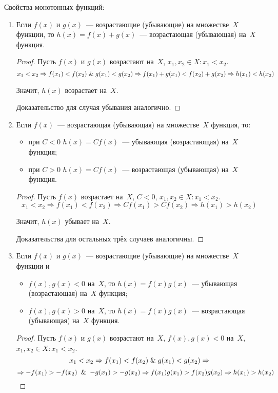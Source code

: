 Свойства монотонных функций:
\begin{enumerate}
	\item Если $f(x)$ и $g(x)$~--- возрастающие (убывающие) на множестве~$X$ функции, то $h(x) = f(x) + g(x)$~--- воз\-ра\-ста\-ющ\-ая (убывающая) на~$X$ функция.
	\begin{proof}
	Пусть $f(x)$ и $g(x)$ возрастают на~$X$, $x_1, x_2 \in X \colon x_1 < x_2$.
	\begin{equation*}
	x_1 < x_2 \Rightarrow
	f(x_1) < f(x_2) \mathrel{\&} g(x_1) < g(x_2) \Rightarrow
	f(x_1) + g(x_1) < f(x_2) + g(x_2) \Rightarrow
	h(x_1) < h(x_2)
	\end{equation*}
	
	Значит, $h(x)$ возрастает на~$X$.
	
	Доказательство для случая убывания аналогично.
	\end{proof}
	
	\item Если $f(x)$~--- возрастающая (убывающая) на множестве~$X$ функция, то:
	\begin{itemize}
		\item при $C < 0$ $h(x) = Cf(x)$~--- убывающая (возрастающая) на~$X$ функция;
		\item при $C > 0$ $h(x) = Cf(x)$~--- возрастающая (убывающая) на~$X$ функция.
	\end{itemize}
	\begin{proof}
	Пусть $f(x)$ возрастает на~$X$, $C < 0$, $x_1, x_2 \in X \colon x_1 < x_2$.
	\begin{equation*}
	x_1 < x_2 \Rightarrow
	f(x_1) < f(x_2) \Rightarrow
	C f(x_1) > C f(x_2) \Rightarrow
	h(x_1) > h(x_2)
	\end{equation*}
	
	Значит, $h(x)$ убывает на~$X$.
	
	Доказательства для остальных трёх случаев аналогичны.
	\end{proof}
	
	\item Если $f(x)$ и $g(x)$~--- возрастающие (убывающие) на множестве~$X$ функции и
	\begin{itemize}
		\item $f(x), g(x) < 0$ на~$X$, то $h(x) = f(x)g(x)$~--- убывающая (возрастающая) на~$X$ функция;
		\item $f(x), g(x) > 0$ на~$X$, то $h(x) = f(x)g(x)$~--- возрастающая (убывающая) на~$X$ функция.
	\end{itemize}
	\begin{proof}
	Пусть $f(x)$ и $g(x)$ возрастают на~$X$, $f(x), g(x) < 0$ на~$X$, $x_1, x_2 \in X \colon x_1 < x_2$.
	\begin{equation*}
	x_1 < x_2 \Rightarrow
	f(x_1) < f(x_2) \mathrel{\&} g(x_1) < g(x_2) \Rightarrow
	\end{equation*}
	\begin{equation*}
	\Rightarrow -f(x_1) > -f(x_2) \And -g(x_1) > -g(x_2) \Rightarrow
	f(x_1)g(x_1) > f(x_2)g(x_2) \Rightarrow
	h(x_1) > h(x_2)
	\end{equation*}
	

\end{proof}
\end{enumerate}
